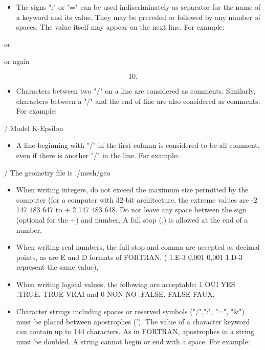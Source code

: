 \begin{itemize}
\item The signs ":" or "=" can be used indiscriminately as separator
for the name of a keyword and its value.
They may be preceded or followed by any number of spaces.
The value itself may appear on the next line. For example:
\end{itemize}


or


or again

\[10.\]

\begin{itemize}
\item Characters between two "/" on a line are considered as comments.
Similarly, characters between a "/" and the end of line are also considered as
comments.
For example:
\end{itemize}

      / Model K-Epsilon

\begin{itemize}
\item A line beginning with "/" in the first column is considered to be all
comment, even if there is another "/" in the line. For example:
\end{itemize}

 / The geometry file is ./mesh/geo

\begin{itemize}
\item When writing integers, do not exceed the maximum size permitted by the
computer (for a computer with 32-bit architecture, the extreme values are
-2 147 483 647 to + 2 147 483 648.
Do not leave any space between the sign (optional for the +) and number.
A full stop (.) is allowed at the end of a number,

\item When writing real numbers, the full stop and comma are accepted
as decimal points, as are E and D formats of FORTRAN.
( 1.E-3  0.001  0,001  1.D-3 represent the same value),

\item When writing logical values, the following are acceptable:
1 OUI  YES  .TRUE.  TRUE  VRAI and 0 NON  NO  .FALSE.  FALSE  FAUX,

\item Character strings including spaces or reserved symbols
("/",":", "=", "\&") must be placed between apostrophes (').
The value of a character keyword can contain up to 144 characters.
As in FORTRAN, apostrophes in a string must be doubled.
A string cannot begin or end with a space. For example:
\end{itemize}

